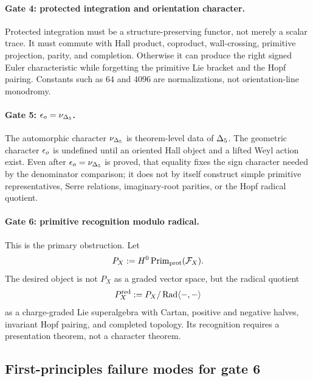 \paragraph{Gate 4: protected integration and orientation character.}
Protected integration must be a structure-preserving functor, not merely
a scalar trace.  It must commute with Hall product, coproduct,
wall-crossing, primitive projection, parity, and completion.  Otherwise
it can produce the right signed Euler characteristic while forgetting
the primitive Lie bracket and the Hopf pairing.  Constants such as
\(64\) and \(4096\) are normalizations, not orientation-line monodromy.

\paragraph{Gate 5: \(\epsilon_o=\nu_{\Delta_5}\).}
The automorphic character \(\nu_{\Delta_5}\) is theorem-level data of
\(\Delta_5\).  The geometric character \(\epsilon_o\) is undefined until
an oriented Hall object and a lifted Weyl action exist.  Even after
\(\epsilon_o=\nu_{\Delta_5}\) is proved, that equality fixes the sign character
needed by the denominator comparison; it does not by itself construct
simple primitive representatives, Serre relations, imaginary-root
parities, or the Hopf radical quotient.

\paragraph{Gate 6: primitive recognition modulo radical.}
This is the primary obstruction.  Let
\[
   P_X := H^0\operatorname{Prim}_{\mathrm{prot}}(\mathcal F_X).
\]
The desired object is not \(P_X\) as a graded vector space, but the
radical quotient
\[
   P_X^{\mathrm{red}}
   :=
   P_X/\operatorname{Rad}\langle-,-\rangle
\]
as a charge-graded Lie superalgebra with Cartan, positive and negative
halves, invariant Hopf pairing, and completed topology.  Its
recognition requires a presentation theorem, not a character theorem.

\subsection{First-principles failure modes for gate 6}

